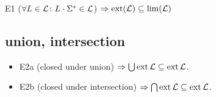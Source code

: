 E1 ($\forall L \in \mathcal{L} \colon L \cdot \Sigma^* \in \mathcal{L}$)
$\Rightarrow \operatorname{ext}(\mathcal{L}) \subseteq \lim(\mathcal{L})$

\subsection{union, intersection}
\begin{itemize}
\item
E2a (closed under union) $\Rightarrow \bigcup \operatorname{ext} \mathcal{L} \subseteq \operatorname{ext} \mathcal{L}$.
\item
E2b (closed under intersection) $\Rightarrow \bigcap \operatorname{ext} \mathcal{L} \subseteq \operatorname{ext} \mathcal{L}$.
\end{itemize}


